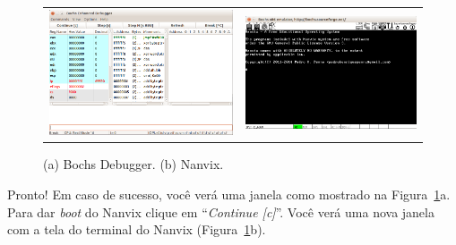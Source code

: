 \documentclass[11pt]{article}
\begin{document}
\begin{figure}[b]
	\centering
	\begin{tabular}{cc}
		\includegraphics[scale=0.2]{img/bochs.png} & 	\includegraphics[scale=0.22]{img/nanvix.png} \\
	\end{tabular}
	\caption{(a) Bochs Debugger. (b) Nanvix.}
	\label{fig:bochs}
\end{figure}

Pronto! Em caso de sucesso, você verá uma janela como mostrado na Figura~\ref{fig:bochs}a. Para dar \textit{boot} do Nanvix clique em ``\textit{Continue [c]}''. Você verá uma nova janela com a tela do terminal do Nanvix (Figura~\ref{fig:bochs}b).
\end{document}
